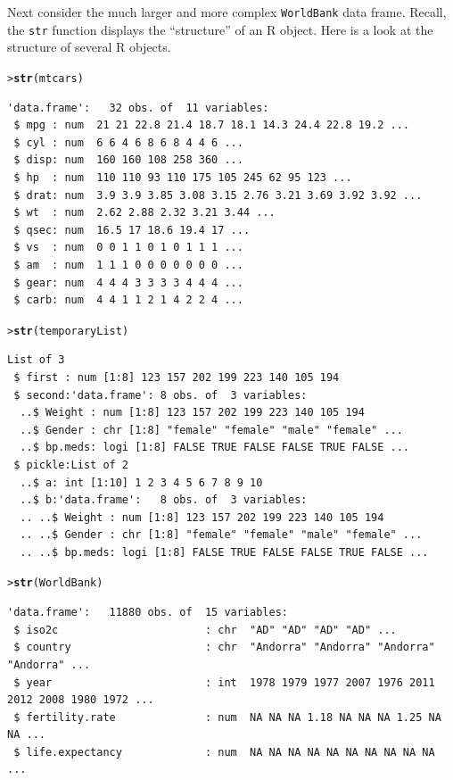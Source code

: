 \documentclass[12pt,oneside]{book}\usepackage[]{graphicx}\usepackage[]{color}
\makeatletter
\newcommand{\hlstd}[1]{\textcolor[rgb]{0.345,0.345,0.345}{#1}}%
\newcommand{\hlkwd}[1]{\textcolor[rgb]{0.737,0.353,0.396}{\textbf{#1}}}%
\newenvironment{kframe}{%
 \def\at@end@of@kframe{}%
 \ifinner\ifhmode%
  \def\at@end@of@kframe{\end{minipage}}%
  \begin{minipage}{\columnwidth}%
 \fi\fi%
 \def\FrameCommand##1{\hskip\@totalleftmargin \hskip-\fboxsep
 \colorbox{shadecolor}{##1}\hskip-\fboxsep
     \hskip-\linewidth \hskip-\@totalleftmargin \hskip\columnwidth}%
 \MakeFramed {\advance\hsize-\width
   \@totalleftmargin\z@ \linewidth\hsize
   \@setminipage}}%
 {\par\unskip\endMakeFramed%
 \at@end@of@kframe}
\newenvironment{knitrout}{}{} %
\makeatother
\begin{document}
Next consider the much larger and more complex \verb+WorldBank+ data frame. Recall, the \verb+str+ function displays the ``structure'' of an R object. Here is a look at the structure of several R objects.
\begin{knitrout}
\color{fgcolor}\begin{kframe}
\begin{alltt}
\hlstd{> }\hlkwd{str}\hlstd{(mtcars)}
\end{alltt}
\begin{verbatim}
'data.frame':	32 obs. of  11 variables:
 $ mpg : num  21 21 22.8 21.4 18.7 18.1 14.3 24.4 22.8 19.2 ...
 $ cyl : num  6 6 4 6 8 6 8 4 4 6 ...
 $ disp: num  160 160 108 258 360 ...
 $ hp  : num  110 110 93 110 175 105 245 62 95 123 ...
 $ drat: num  3.9 3.9 3.85 3.08 3.15 2.76 3.21 3.69 3.92 3.92 ...
 $ wt  : num  2.62 2.88 2.32 3.21 3.44 ...
 $ qsec: num  16.5 17 18.6 19.4 17 ...
 $ vs  : num  0 0 1 1 0 1 0 1 1 1 ...
 $ am  : num  1 1 1 0 0 0 0 0 0 0 ...
 $ gear: num  4 4 4 3 3 3 3 4 4 4 ...
 $ carb: num  4 4 1 1 2 1 4 2 2 4 ...
\end{verbatim}
\begin{alltt}
\hlstd{> }\hlkwd{str}\hlstd{(temporaryList)}
\end{alltt}
\begin{verbatim}
List of 3
 $ first : num [1:8] 123 157 202 199 223 140 105 194
 $ second:'data.frame':	8 obs. of  3 variables:
  ..$ Weight : num [1:8] 123 157 202 199 223 140 105 194
  ..$ Gender : chr [1:8] "female" "female" "male" "female" ...
  ..$ bp.meds: logi [1:8] FALSE TRUE FALSE FALSE TRUE FALSE ...
 $ pickle:List of 2
  ..$ a: int [1:10] 1 2 3 4 5 6 7 8 9 10
  ..$ b:'data.frame':	8 obs. of  3 variables:
  .. ..$ Weight : num [1:8] 123 157 202 199 223 140 105 194
  .. ..$ Gender : chr [1:8] "female" "female" "male" "female" ...
  .. ..$ bp.meds: logi [1:8] FALSE TRUE FALSE FALSE TRUE FALSE ...
\end{verbatim}
\begin{alltt}
\hlstd{> }\hlkwd{str}\hlstd{(WorldBank)}
\end{alltt}
\begin{verbatim}
'data.frame':	11880 obs. of  15 variables:
 $ iso2c                       : chr  "AD" "AD" "AD" "AD" ...
 $ country                     : chr  "Andorra" "Andorra" "Andorra" "Andorra" ...
 $ year                        : int  1978 1979 1977 2007 1976 2011 2012 2008 1980 1972 ...
 $ fertility.rate              : num  NA NA NA 1.18 NA NA NA 1.25 NA NA ...
 $ life.expectancy             : num  NA NA NA NA NA NA NA NA NA NA ...

\end{verbatim}
\end{kframe}
\end{knitrout}
\end{document}
